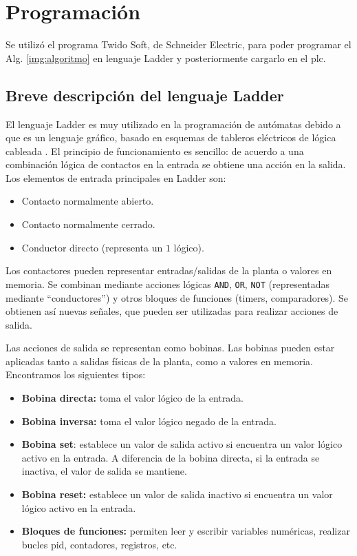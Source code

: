 \section{Programación}
\label{sec:Programacion}
Se utilizó el programa Twido Soft, de Schneider Electric, para poder programar
el Alg. \ref{img:algoritmo} en lenguaje Ladder y posteriormente cargarlo en el
\gls{plc}.

\subsection{Breve descripción del lenguaje Ladder}

El lenguaje Ladder es muy utilizado en la programación de autómatas debido a
que es un lenguaje gráfico, basado en esquemas de tableros eléctricos de
lógica cableada \cite{bib:ApuntesPuglesiPLC}.
El principio de funcionamiento es sencillo: de acuerdo a una combinación
lógica de contactos en la entrada se obtiene una acción en la
salida.
Los elementos de entrada principales en Ladder son:

 \begin{itemize}
  \item Contacto normalmente abierto.
  \item Contacto normalmente cerrado.
  \item Conductor directo (representa un $1$ lógico).
 \end{itemize}

Los contactores pueden representar entradas/salidas de la
planta o valores en memoria.
Se combinan mediante acciones lógicas \verb|AND|, \verb|OR|, \verb|NOT|
(representadas mediante ``conductores'') y otros bloques de funciones (timers,
comparadores).
Se obtienen así nuevas señales, que pueden ser utilizadas para realizar
acciones de salida.

Las acciones de salida se representan como bobinas.
Las bobinas pueden estar aplicadas tanto a salidas físicas de la planta, como a
valores en memoria. Encontramos los siguientes tipos:

  \begin{itemize}
   \item \textbf{Bobina directa:} toma el valor lógico de la entrada.
   \item \textbf{Bobina inversa:} toma el valor lógico negado de la entrada.
   \item \textbf{Bobina set}: establece un valor de salida activo si encuentra
un valor lógico activo en la entrada. A diferencia de la bobina directa, si la
entrada se inactiva, el valor de salida se mantiene.
   \item \textbf{Bobina reset:} establece un valor de salida inactivo si
encuentra un valor lógico activo en la entrada.
   \item \textbf{Bloques de funciones:} permiten leer y escribir variables
numéricas, realizar bucles \gls{pid}, contadores, registros, etc.
  \end{itemize}
  
